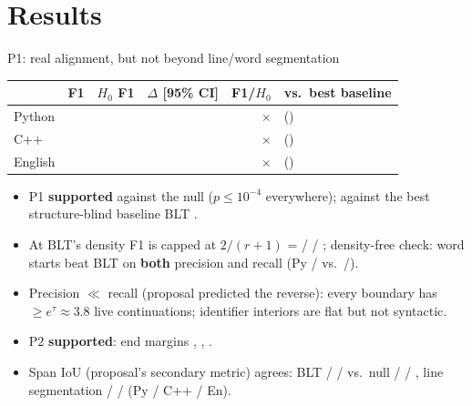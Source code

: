 \documentclass[aspectratio=169,11pt]{beamer}
\newcommand{\hl}[1]{\textcolor{acc}{\textbf{#1}}}
\begin{document}
\section{Results}
\begin{frame}{P1: real alignment, but not beyond line/word segmentation}
\centering\small
\begin{tabular}{lrrrrl}
\toprule
& F1 & $H_0$ F1 & $\Delta$ [95\% CI] & F1/$H_0$ & vs.\ best baseline \\
\midrule
Python & \FonePy{} & \FoneNullPy{} & \MarginPy{} \MarginCIPy{} & \xRatioPy{}$\times$ & \VsBasePy{} (\StrongestPy{}) \\
C++ & \FoneCpp{} & \FoneNullCpp{} & \MarginCpp{} \MarginCICpp{} & \xRatioCpp{}$\times$ & \VsBaseCpp{} (\StrongestCpp{}) \\
English & \FoneEn{} & \FoneNullEn{} & \MarginEn{} \MarginCIEn{} & \xRatioEn{}$\times$ & \VsBaseEn{} (\StrongestEn{}) \\
\bottomrule
\end{tabular}
\vspace{1em}
\begin{itemize}
\item P1 \hl{supported} against the null ($p\le10^{-4}$ everywhere); against the best structure-blind baseline BLT \RTwoAll{}.
\item At BLT's density F1 is capped at $2/(r{+}1)$ = \xFoneCapPy{} / \xFoneCapCpp{} / \xFoneCapEn{}; density-free check: word starts beat BLT on \hl{both} precision and recall (Py \xWordPPy{}/\xWordRPy{} vs.\ \PrecPy{}/\RecPy{}).
\item Precision $\ll$ recall (proposal predicted the reverse): every boundary has $\ge e^{\tau}\approx3.8$ live continuations; identifier interiors are flat but not syntactic.
\item P2 \hl{supported}: end margins \EndMarginPy{}, \EndMarginCpp{}, \EndMarginEn{}.
\item Span IoU (proposal's secondary metric) agrees: BLT \IouBltPy{} / \IouBltCpp{} / \IouBltEn{} vs.\ null \IouNullPy{} / \IouNullCpp{} / \IouNullEn{}, line segmentation \IouLinePy{} / \IouLineCpp{} / \IouLineEn{} (Py / C++ / En).
\end{itemize}
\end{frame}
\end{document}
